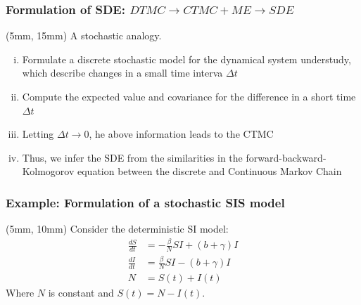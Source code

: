 %
%
%
\begin{frame}
    \frametitle{Formulation of SDE: $DTMC \to CTMC + ME \to SDE$}
%
        \begin{textblock*}{60mm}(5mm, 15mm)
            A stochastic analogy.
            \begin{enumerate}[i)]
                \item<2->
                    Formulate a discrete stochastic
                    model for the dynamical system
                    understudy, which describe changes
                    in a small time interva $\Delta t$
                \item<3->
                    Compute the expected value and
                    covariance for the difference in a short
                    time $\Delta t$
                \item<4->
                    Letting $\Delta t \to 0$, 
                    he above information
                    leads to the CTMC
                \item<5->
                    Thus, we infer the SDE from the
                    similarities in the forward-backward-Kolmogorov equation 
                    between the
                    discrete and Continuous Markov
                    Chain
            \end{enumerate}
        \end{textblock*}
\end{frame}
%
\begin{frame}%
    \frametitle{Example: Formulation of a stochastic SIS model}
    \begin{textblock*}{50mm}(5mm, 10mm)
    Consider the deterministic SI model:
        \begin{align*}
            \frac{dS}{dt} &= -\frac{\beta}{N} S I + (b +\gamma) I
                \\
            \frac{dI}{dt} &= \frac{\beta}{N} S I - (b +\gamma) I
                \\
            N &= S(t)+ I(t)
        \end{align*}
        Where $N$ is constant and  $S(t) = N - I(t)$.
    \end{textblock*}
\end{frame}
